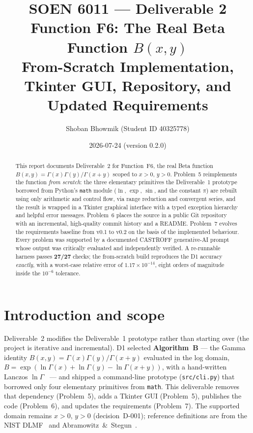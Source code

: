 \documentclass[11pt,a4paper]{article}
\title{\textbf{SOEN 6011 --- Deliverable 2}\\[2pt]
       \large Function F6: The Real Beta Function $B(x,y)$\\
       From-Scratch Implementation, Tkinter GUI, Repository, and Updated Requirements}
\author{Shoban Bhowmik \quad (Student ID 40325778)}
\date{2026-07-24 \quad (version 0.2.0)}
\begin{document}
\maketitle

\begin{abstract}
\noindent This report documents Deliverable~2 for Function~F6, the real Beta
function $B(x,y)=\Gamma(x)\Gamma(y)/\Gamma(x+y)$ scoped to $x>0,\,y>0$.
Problem~5 reimplements the function \emph{from scratch}: the three elementary
primitives the Deliverable~1 prototype borrowed from Python's \texttt{math}
module ($\ln$, $\exp$, $\sin$, and the constant $\pi$) are rebuilt using only
arithmetic and control flow, via range reduction and convergent series, and the
result is wrapped in a Tkinter graphical interface with a typed exception
hierarchy and helpful error messages. Problem~6 places the source in a public
Git repository with an incremental, high-quality commit history and a README.
Problem~7 evolves the requirements baseline from v0.1 to v0.2 on the basis of the
implemented behaviour. Every problem was supported by a documented CASTROFF
generative-AI prompt whose output was critically evaluated and independently
verified. A re-runnable harness passes \textbf{27/27} checks; the from-scratch
build reproduces the D1 accuracy \emph{exactly}, with a worst-case relative error
of $1.17\times10^{-14}$, eight orders of magnitude inside the $10^{-6}$ tolerance.
\end{abstract}

\tableofcontents
\bigskip

\section{Introduction and scope}
Deliverable~2 modifies the Deliverable~1 prototype rather than starting over
(the project is iterative and incremental). D1 selected \textbf{Algorithm~B} ---
the Gamma identity $B(x,y)=\Gamma(x)\Gamma(y)/\Gamma(x+y)$ evaluated in the log
domain, $B=\exp(\ln\Gamma(x)+\ln\Gamma(y)-\ln\Gamma(x+y))$, with a hand-written
Lanczos $\ln\Gamma$~\cite{lanczos1964gamma,press2007numerical} --- and shipped a
command-line prototype (\texttt{src/cli.py}) that borrowed only four elementary
primitives from \texttt{math}. This deliverable removes that dependency
(Problem~5), adds a Tkinter GUI (Problem~5), publishes the code (Problem~6), and
updates the requirements (Problem~7). The supported domain remains $x>0,\,y>0$
(decision~D-001); reference definitions are from the NIST DLMF~\cite{dlmf512} and
Abramowitz~\&~Stegun~\cite{abramowitz1964handbook}.
\end{document}
